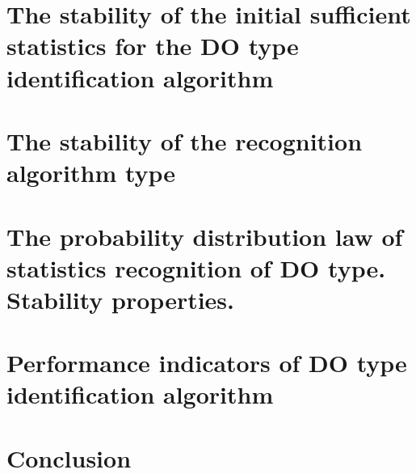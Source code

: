 \documentclass[
11pt,%
tightenlines,%
twoside,%
onecolumn,%
nofloats,%
nobibnotes,%
nofootinbib,%
superscriptaddress,%
noshowpacs,%
centertags]%
{revtex4}
\begin{document}
\section{The stability of the initial sufficient statistics for the DO type identification algorithm}



\section{The stability of the recognition algorithm type}



\section{The probability distribution law of statistics recognition of DO type. Stability properties.}



\section{Performance indicators of DO type identification algorithm}



\section{Conclusion}


\end{document}
